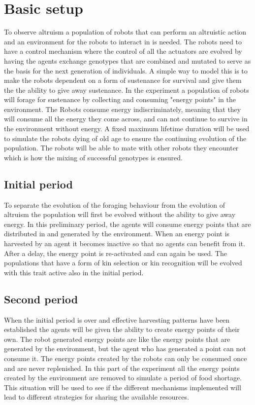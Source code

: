 \documentclass[a4paper]{book}
\begin{document}
\section{Basic setup}
To observe altruism a population of robots that can perform an altruistic action and an environment for the robots to interact in is needed.
The robots need to have a control mechanism where the control of all the actuators are evolved by having the agents exchange genotypes that are combined and mutated to serve as the basis for the next generation of individuals.
A simple way to model this is to make the robots dependent on a form of sustenance for survival and give them the the ability to give away sustenance.
In the experiment a population of robots will forage for sustenance by collecting and consuming "energy points" in the environment.
The Robots consume energy indiscriminately, meaning that they will consume all the energy they come across, and can not continue to survive in the environment without energy.
A fixed maximum lifetime duration will be used to simulate the robots dying of old age to ensure the continuing evolution of the population. 
The robots will be able to mate with other robots they encounter which is how the mixing of successful genotypes is ensured.  

\subsection{Initial period}

To separate the evolution of the foraging behaviour from the evolution of altruism the population will first be evolved without the ability to give away energy.
In this preliminary period, the agents will consume energy points that are distributed in and generated by the environment. 
When an energy point is harvested by an agent it becomes inactive so that no agents can benefit from it. 
After a delay, the energy point is re-activated and can again be used.  
The populations that have a form of kin selection or kin recognition will be evolved with this trait active also in the initial period.

\subsection{Second period}

When the initial period is over and effective harvesting patterns have been established the agents will be given the ability to create energy points of their own.
The robot generated energy points are like the energy points that are generated by the environment, but the agent who has generated a point can not consume it. 
The energy points created by the robots can only be consumed once and are never replenished.
In this part of the experiment all the energy points created by the environment are removed to simulate a period of food shortage. 
This situation will be used to see if the different mechanisms implemented will lead to different strategies for sharing the available resources.
\end{document}
